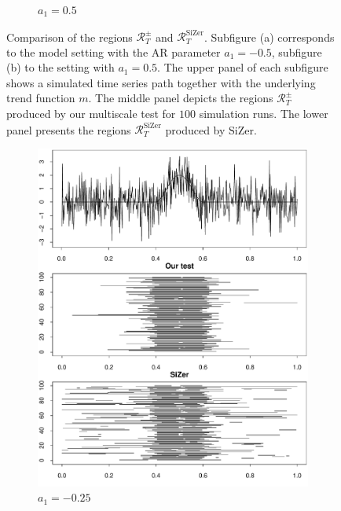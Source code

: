 \begin{figure}[t]
\begin{subfigure}{.5\textwidth}
\caption{$a_1 = 0.5$}
\end{subfigure}
\caption{Comparison of the regions $\mathcal{R}_T^\pm$ and $\mathcal{R}_T^{\text{SiZer}}$. Subfigure (a) corresponds to the model setting with the AR parameter $a_1 = -0.5$, subfigure (b) to the setting with $a_1 = 0.5$. The upper panel of each subfigure shows a simulated time series path together with the underlying trend function $m$. The middle panel depicts the regions $\mathcal{R}_T^\pm$ produced by our multiscale test for $100$ simulation runs. The lower panel presents the regions $\mathcal{R}_T^{\text{SiZer}}$ produced by SiZer.}  
\label{fig:comparison_SiZer}
\end{figure}

\begin{figure}[t]
\begin{subfigure}{.5\textwidth}
\centering
\includegraphics[width=.9\linewidth]{Plots/min_int_with_T_500_a1_-25.pdf}
\caption{$a_1 = -0.25$}
\end{subfigure}
\begin{subfigure}{.5\textwidth}
\centering

\end{subfigure}
\end{figure}
